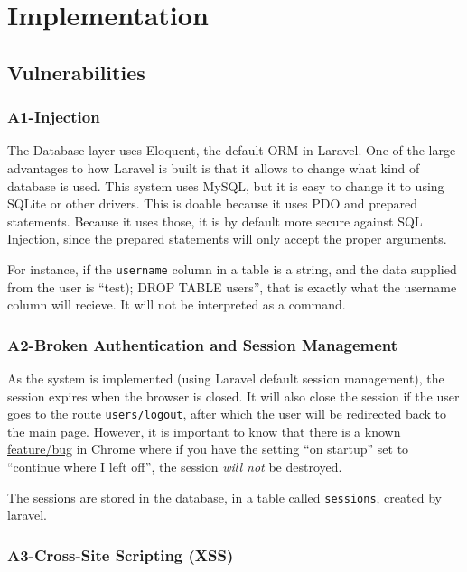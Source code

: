 \chapter{Implementation}
\label{ch:implementation}

\section{Vulnerabilities}
\subsection{A1-Injection}

The Database layer uses Eloquent, the default ORM in Laravel. One of the
large advantages to how Laravel is built is that it allows to change
what kind of database is used. This system uses MySQL, but it is easy to
change it to using SQLite or other drivers. This is doable because it
uses PDO and prepared statements. Because it uses those, it is by
default more secure against SQL Injection, since the prepared statements
will only accept the proper arguments.

For instance, if the \texttt{username} column in a table is a string,
and the data supplied from the user is ``test); DROP TABLE users'', that
is exactly what the username column will recieve. It will not be
interpreted as a command.

\subsection{A2-Broken Authentication and Session Management}

As the system is implemented (using Laravel default session management),
the session expires when the browser is closed. It will also close the
session if the user goes to the route \texttt{users/logout}, after which
the user will be redirected back to the main page. However, it is
important to know that there is
\href{https://productforums.google.com/d/msg/chrome/9l-gKYIUg50/HOvdZbPiuXAJ}{a
known feature/bug} in Chrome where if you have the setting ``on
startup'' set to ``continue where I left off'', the session \emph{will
not} be destroyed.

The sessions are stored in the database, in a table called
\texttt{sessions}, created by laravel.

\subsection{A3-Cross-Site Scripting (XSS)}

